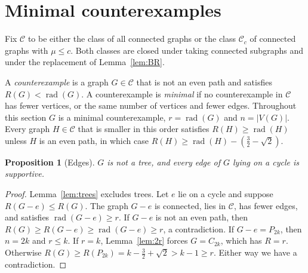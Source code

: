 \documentclass[11pt,a4paper]{article}
\newtheorem{proposition}[theorem]{Proposition}
\theoremstyle{definition}
\newcommand{\rad}{\operatorname{rad}}
\newcommand{\C}{\mathcal{C}}
\begin{document}
\section{Minimal counterexamples}\label{sec:structure}

Fix $\C$ to be either the class of all connected graphs or the class $\C_c$ of connected graphs with $\mu\le c$. Both classes are closed under taking connected subgraphs and under the replacement of Lemma~\ref{lem:BR}.

A \emph{counterexample} is a graph $G\in\C$ that is not an even path and satisfies $R(G)<\rad(G)$. A counterexample is \emph{minimal} if no counterexample in $\C$ has fewer vertices, or the same number of vertices and fewer edges. Throughout this section $G$ is a minimal counterexample, $r=\rad(G)$ and $n=|V(G)|$. Every graph $H\in\C$ that is smaller in this order satisfies $R(H)\ge\rad(H)$ unless $H$ is an even path, in which case $R(H)\ge\rad(H)-(\frac32-\sqrt2)$.

\begin{proposition}[Edges]\label{prop:E2}
$G$ is not a tree, and every edge of $G$ lying on a cycle is supportive.
\end{proposition}
\begin{proof}
Lemma~\ref{lem:trees} excludes trees. Let $e$ lie on a cycle and suppose $R(G-e)\le R(G)$. The graph $G-e$ is connected, lies in $\C$, has fewer edges, and satisfies $\rad(G-e)\ge r$. If $G-e$ is not an even path, then $R(G)\ge R(G-e)\ge\rad(G-e)\ge r$, a contradiction. If $G-e=P_{2k}$, then $n=2k$ and $r\le k$. If $r=k$, Lemma~\ref{lem:2r} forces $G=C_{2k}$, which has $R=r$. Otherwise $R(G)\ge R(P_{2k})=k-\frac32+\sqrt2>k-1\ge r$. Either way we have a contradiction.
\end{proof}
\end{document}
